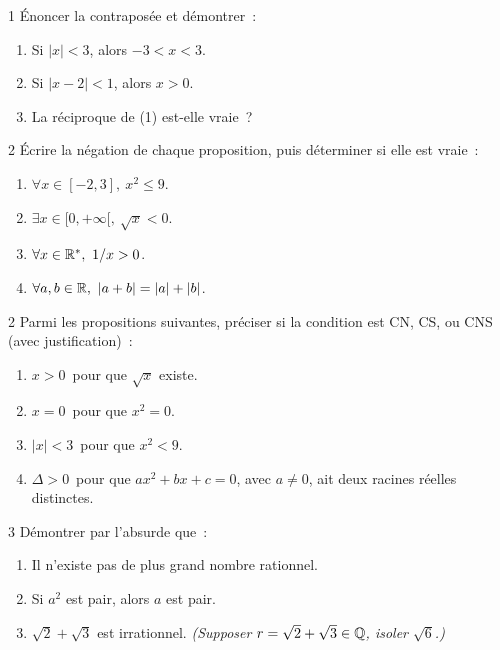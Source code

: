 \begin{bilan}
\begin{exo}{1}
\'Enoncer la contrapos\'ee et d\'emontrer~:
\begin{enumerate}
  \item \og Si $|x|<3$, alors $-3<x<3$.\fg
  \item \og Si $|x-2|<1$, alors $x>0$.\fg
  \item La r\'eciproque de (1) est-elle vraie~?
\end{enumerate}
\end{exo}

\begin{exo}{2}
\'Ecrire la n\'egation de chaque proposition, puis d\'eterminer si elle est vraie~:
\begin{enumerate}
  \item $\forall x\in[-2,3],\ x^2\leq9$.
  \item $\exists x\in[0,+\infty[,\ \sqrt{x}<0$.
  \item $\forall x\in\R^*,\ 1/x>0$.
  \item $\forall a,b\in\R,\ |a+b|=|a|+|b|$.
\end{enumerate}
\end{exo}

\begin{exo}{2}
Parmi les propositions suivantes, pr\'eciser si la condition est
CN, CS, ou CNS (avec justification)~:
\begin{enumerate}
  \item \og $x>0$\fg\ pour que \og $\sqrt{x}$ existe\fg.
  \item \og $x=0$\fg\ pour que \og $x^2=0$\fg.
  \item \og $|x|<3$\fg\ pour que \og $x^2<9$\fg.
  \item \og $\Delta>0$\fg\ pour que \og $ax^2+bx+c=0$,
        avec $a\ne0$, ait deux racines r\'eelles distinctes\fg.
\end{enumerate}
\end{exo}

\begin{exo}{3}
D\'emontrer par l'absurde que~:
\begin{enumerate}
  \item Il n'existe pas de plus grand nombre rationnel.
  \item Si $a^2$ est pair, alors $a$ est pair.
  \item $\sqrt{2}+\sqrt{3}$ est irrationnel.
        \emph{(Supposer $r=\sqrt{2}+\sqrt{3}\in\mathbb{Q}$, isoler $\sqrt{6}$.)}
\end{enumerate}
\end{exo}


\end{bilan}
